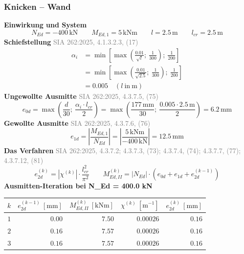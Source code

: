 \documentclass[11pt,a4paper]{article}
\newcommand{\normref}[1]{{\small\textcolor{gray}{#1}}}
\begin{document}
\subsubsection{Knicken – Wand}
\noindent\textbf{Einwirkung und System}
\begin{equation*}
N_{Ed} = -400\,\mathrm{kN} \qquad M_{Ed,1} = 5\,\mathrm{kNm} \qquad l = 2.5\,\mathrm{m} \qquad l_{cr} = 2.5\,\mathrm{m}
\end{equation*}
\noindent\textbf{Schiefstellung} \hfill \normref{SIA 262:2025, 4.1.3.2.3, (17)}
\begin{equation*}
\begin{aligned}
  \alpha_i &= \min\left[\max\left(\frac{0.01}{\sqrt{l}};\ \frac{1}{300}\right);\ \frac{1}{200}\right] \\
  &= \min\left[\max\left(\frac{0.01}{\sqrt{2.5}};\ \frac{1}{300}\right);\ \frac{1}{200}\right] \\
  &= 0.005 \quad \left(l\ \text{in}\ \mathrm{m}\right)
\end{aligned}
\end{equation*}
\noindent\textbf{Ungewollte Ausmitte} \hfill \normref{SIA 262:2025, 4.3.7.5, (75)}
\begin{equation*}
e_{0d} = \max\left(\frac{d}{30};\ \frac{\alpha_i \cdot l_{cr}}{2}\right) = \max\left(\frac{177\,\mathrm{mm}}{30};\ \frac{0.005 \cdot 2.5\,\mathrm{m}}{2}\right) = 6.2\,\mathrm{mm}
\end{equation*}
\noindent\textbf{Gewollte Ausmitte} \hfill \normref{SIA 262:2025, 4.3.7.6, (76)}
\begin{equation*}
e_{1d} = \left|\frac{M_{Ed,1}}{N_{Ed}}\right| = \left|\frac{5\,\mathrm{kNm}}{-400\,\mathrm{kN}}\right| = 12.5\,\mathrm{mm}
\end{equation*}
\noindent\textbf{Das Verfahren} \hfill \normref{SIA 262:2025, 4.3.7.2; 4.3.7.3, (73); 4.3.7.4, (74); 4.3.7.7, (77); 4.3.7.12, (81)}
\begin{equation*}
e_{2d}^{(k)} = \left|\chi^{(k)}\right| \cdot \frac{l_{cr}^{2}}{\pi^{2}} \qquad M_{Ed,II}^{(k)} = \left|N_{Ed}\right| \cdot \left(e_{0d} + e_{1d} + e_{2d}^{(k-1)}\right)
\end{equation*}
\noindent\textbf{Ausmitten-Iteration bei N\_Ed = 400.0 kN}
\begin{longtable}{rrrrr}
\hline
$k$ & $e_{2d}^{(k-1)}\ [\mathrm{mm}]$ & $M_{Ed,II}^{(k)}\ [\mathrm{kNm}]$ & $\chi^{(k)}\ [\mathrm{m}^{-1}]$ & $e_{2d}^{(k)}\ [\mathrm{mm}]$ \\
\hline
\endhead
$1$ & $0.00$ & $7.50$ & $0.00026$ & $0.16$ \\
$2$ & $0.16$ & $7.57$ & $0.00026$ & $0.16$ \\
$3$ & $0.16$ & $7.57$ & $0.00026$ & $0.16$ \\
\hline
\end{longtable}
\end{document}
